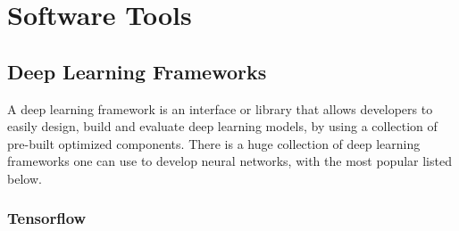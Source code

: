 \documentclass[a4paper, 12pt]{article}
\numberwithin{equation}{section}
\numberwithin{figure}{section}
\numberwithin{table}{section}
\begin{document}
%	
%	
%	
%	
%	
	
	\newpage
	
	\section{Software Tools}
	
	\subsection{Deep Learning Frameworks} \label{seciton:dl_frameworks}
	A deep learning framework is an interface or library that allows developers to easily design, build and evaluate deep learning models, by using a collection of pre-built optimized components. There is a huge collection of deep learning frameworks one can use to develop neural networks, with the most popular listed below.
	
	\subsubsection*{Tensorflow}
	
\end{document}
